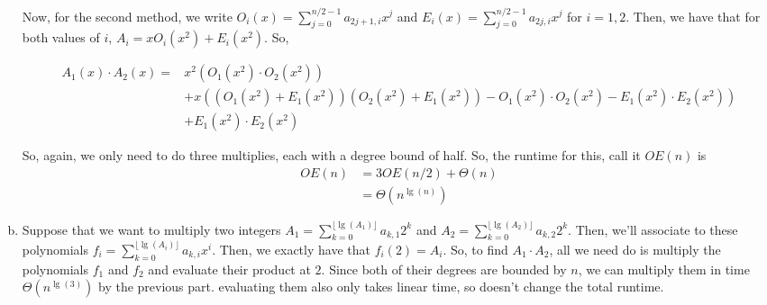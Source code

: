 \documentclass{article}
\begin{document}
\begin{enumerate}[a.]
Now, for the second method, we write $O_i(x) = \sum_{j=0}^{n/2-1} a_{2j+1,i}x^j$ and $E_i(x) = \sum_{j=0}^{n/2-1} a_{2j,i}x^j$ for $i=1,2$. Then, we have that for both values of $i$, $A_i = x O_i(x^2) + E_i(x^2)$. So,

 \begin{align*}
 A_1(x)\cdot A_2(x) =& x^2 (O_1(x^2)\cdot O_2(x^2))\\
 & + x((O_1(x^2)+ E_1(x^2))(O_2(x^2) +E_1(x^2)) - O_1(x^2)\cdot O_2(x^2) -E_1(x^2)\cdot E_2(x^2))\\
 & + E_1(x^2) \cdot E_2(x^2)
  \end{align*}

So, again, we only need to do three multiplies, each with a degree bound of half. So, the runtime for this, call it $OE(n)$ is
\begin{align*}
OE(n) &= 3OE(n/2) + \Theta(n)\\
&= \Theta(n^{\lg(n)})
\end{align*}
\item
Suppose that we want to multiply two integers $A_1 = \sum_{k=0}^{\lfloor \lg(A_1) \rfloor}a_{k,1}2^k$ and $A_2 = \sum_{k=0}^{\lfloor \lg(A_2) \rfloor}a_{k,2}2^k$. Then, we'll associate to these polynomials $f_i = \sum_{k=0}^{\lfloor\lg(A_i)\rfloor} a_{k,i}x^i$. Then, we exactly have that $f_i(2) =A_i$. So, to find $A_1\cdot A_2$, all we need do is multiply the polynomials $f_1$ and $f_2$ and evaluate their product at $2$. Since both of their degrees are bounded by $n$, we can multiply them in time $\Theta(n^{\lg(3)})$ by the previous part. evaluating them also only takes linear time, so doesn't change the total runtime.
\end{enumerate}
\end{document}
